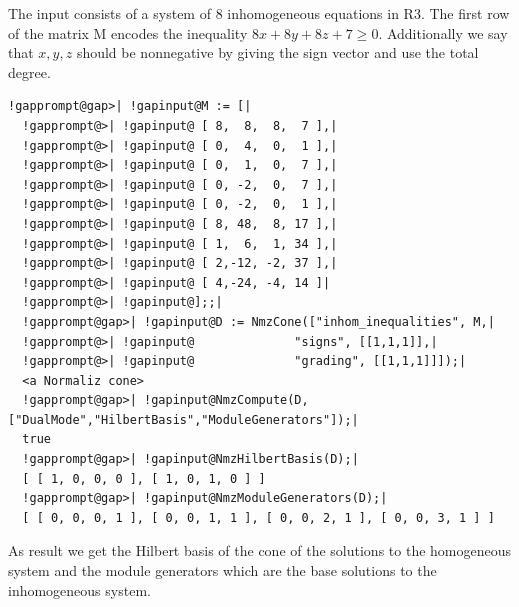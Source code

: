 \documentclass[a4paper,11pt]{report}
\begin{document}
{{ The input consists of a system of 8 inhomogeneous equations in
R\texttt{}3. The first row of the matrix M encodes the inequality $8x + 8y + 8z + 7 \geq 0$. Additionally we say that $x, y, z$ should be non\texttt{}negative by giving the sign vector and use
the total degree. 
\begin{Verbatim}[commandchars=!@|,fontsize=\small,frame=single,label=Example]
  !gapprompt@gap>| !gapinput@M := [|
  !gapprompt@>| !gapinput@ [ 8,  8,  8,  7 ],|
  !gapprompt@>| !gapinput@ [ 0,  4,  0,  1 ],|
  !gapprompt@>| !gapinput@ [ 0,  1,  0,  7 ],|
  !gapprompt@>| !gapinput@ [ 0, -2,  0,  7 ],|
  !gapprompt@>| !gapinput@ [ 0, -2,  0,  1 ],|
  !gapprompt@>| !gapinput@ [ 8, 48,  8, 17 ],|
  !gapprompt@>| !gapinput@ [ 1,  6,  1, 34 ],|
  !gapprompt@>| !gapinput@ [ 2,-12, -2, 37 ],|
  !gapprompt@>| !gapinput@ [ 4,-24, -4, 14 ]|
  !gapprompt@>| !gapinput@];;|
  !gapprompt@gap>| !gapinput@D := NmzCone(["inhom_inequalities", M,|
  !gapprompt@>| !gapinput@              "signs", [[1,1,1]],|
  !gapprompt@>| !gapinput@              "grading", [[1,1,1]]]);|
  <a Normaliz cone>
  !gapprompt@gap>| !gapinput@NmzCompute(D,["DualMode","HilbertBasis","ModuleGenerators"]);|
  true
  !gapprompt@gap>| !gapinput@NmzHilbertBasis(D);|
  [ [ 1, 0, 0, 0 ], [ 1, 0, 1, 0 ] ]
  !gapprompt@gap>| !gapinput@NmzModuleGenerators(D);|
  [ [ 0, 0, 0, 1 ], [ 0, 0, 1, 1 ], [ 0, 0, 2, 1 ], [ 0, 0, 3, 1 ] ]
\end{Verbatim}
 

 As result we get the Hilbert basis of the cone of the solutions to the
homogeneous system and the module generators which are the base solutions to
the inhomogeneous system. 

 }

 }

   
\end{document}
